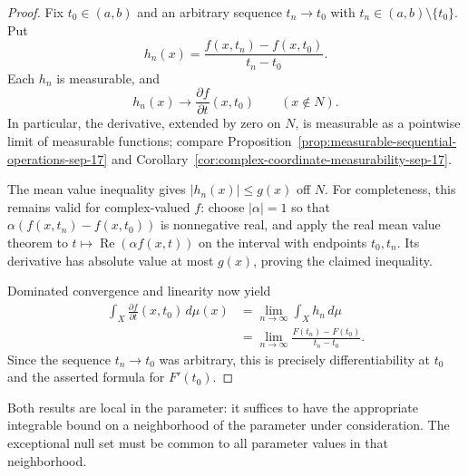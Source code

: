 \begin{proof}
  Fix $t_0\in(a,b)$ and an arbitrary sequence $t_n\to t_0$ with
  $t_n\in(a,b)\setminus\{t_0\}$. Put
  \[
    h_n(x)=\frac{f(x,t_n)-f(x,t_0)}{t_n-t_0}.
  \]
  Each $h_n$ is measurable, and
  \[
    h_n(x)\longrightarrow\frac{\partial f}{\partial t}(x,t_0)
    \qquad(x\notin N).
  \]
  In particular, the derivative, extended by zero on $N$, is
  measurable as a pointwise limit of measurable functions; compare
  Proposition~\ref{prop:measurable-sequential-operations-sep-17} and
  Corollary~\ref{cor:complex-coordinate-measurability-sep-17}.

  The mean value inequality gives $|h_n(x)|\leq g(x)$ off $N$.
  For completeness, this remains valid for complex-valued $f$:
  choose $|\alpha|=1$ so that
  $\alpha(f(x,t_n)-f(x,t_0))$ is nonnegative real, and apply the
  real mean value theorem to $t\mapsto\operatorname{Re}(\alpha f(x,t))$
  on the interval with endpoints $t_0,t_n$. Its derivative has
  absolute value at most $g(x)$, proving the claimed inequality.

  Dominated convergence and linearity now yield
  \begin{align*}
    \int_X\frac{\partial f}{\partial t}(x,t_0)\,d\mu(x)
      &=\lim_{n\to\infty}\int_X h_n\,d\mu\\
      &=\lim_{n\to\infty}
        \frac{F(t_n)-F(t_0)}{t_n-t_0}.
  \end{align*}
  Since the sequence $t_n\to t_0$ was arbitrary, this is precisely
  differentiability at $t_0$ and the asserted formula for $F'(t_0)$.
\end{proof}

\begin{remark}
  Both results are local in the parameter: it suffices to have the
  appropriate integrable bound on a neighborhood of the parameter
  under consideration. The exceptional null set must be common to
  all parameter values in that neighborhood.
\end{remark}

